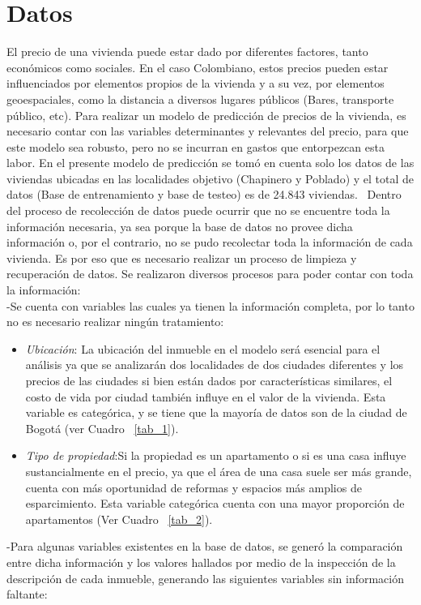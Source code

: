 \documentclass[conference, 10pt]{IEEEtran}
\begin{document}
\section{Datos} \label{AA}

El precio de una vivienda puede estar dado por diferentes factores, tanto económicos como sociales. En el caso Colombiano, estos precios pueden estar influenciados por elementos propios de la vivienda y a su vez, por elementos geoespaciales, como la distancia a diversos lugares públicos (Bares, transporte público, etc). Para realizar un modelo de predicción de precios de la vivienda, es necesario contar con las variables determinantes y relevantes del precio, para que este modelo sea robusto, pero no se incurran en gastos que entorpezcan esta labor. En el presente modelo de predicción se tomó en cuenta solo los datos de  las viviendas ubicadas en las localidades objetivo (Chapinero y Poblado) y el total de datos (Base de entrenamiento y base de testeo) es de 24.843 viviendas. \
Dentro del proceso de recolección de datos puede ocurrir que no se encuentre toda la información necesaria, ya sea porque la base de datos no provee dicha información o, por el contrario, no se pudo recolectar toda la información de cada vivienda. Es por eso que es necesario realizar un proceso de limpieza y recuperación de datos. Se realizaron diversos procesos para poder contar con toda la información:\\ 
-Se cuenta con variables las cuales ya tienen la información completa, por lo tanto no es necesario realizar ningún tratamiento:
\begin{itemize}
\item \textit{Ubicación}: La ubicación del inmueble en el modelo será esencial para el análisis ya que se analizarán dos localidades de dos ciudades diferentes y los precios de las ciudades si bien están dados por características similares, el costo de vida por ciudad también influye en el valor de la vivienda. Esta variable es categórica, y se tiene que la mayoría de datos son de la ciudad de Bogotá (ver Cuadro ~\ref{tab_1}).
\item \textit{Tipo de propiedad}:Si la propiedad es un apartamento o si es una casa influye sustancialmente en el precio, ya que el área de una casa suele ser más grande, cuenta con más oportunidad de reformas y espacios más amplios de esparcimiento. Esta variable categórica cuenta con una mayor proporción de apartamentos (Ver Cuadro ~\ref{tab_2}).
\end{itemize}
-Para algunas variables existentes en la base de datos, se generó la comparación entre dicha información y los valores hallados por medio de la inspección de la descripción de cada inmueble, generando las siguientes variables sin información faltante:
\end{document}
